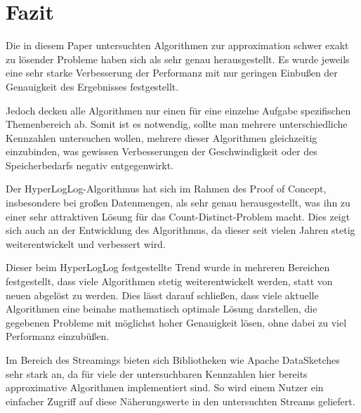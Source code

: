 \section{Fazit}

Die in diesem Paper untersuchten Algorithmen zur approximation schwer exakt zu lösender Probleme haben sich als sehr genau herausgestellt.
Es wurde jeweils eine sehr starke Verbesserung der Performanz mit nur geringen Einbußen der Genauigkeit des Ergebnisses festgestellt.

Jedoch decken alle Algorithmen nur einen für eine einzelne Aufgabe spezifischen Themenbereich ab.
Somit ist es notwendig, sollte man mehrere unterschiedliche Kennzahlen untersuchen wollen, mehrere dieser Algorithmen gleichzeitig einzubinden, was gewissen Verbesserungen der Geschwindigkeit oder des Speicherbedarfs negativ entgegenwirkt.

Der HyperLogLog-Algorithmus hat sich im Rahmen des Proof of Concept, insbesondere bei großen Datenmengen, als sehr genau herausgestellt, was ihn zu einer sehr attraktiven Lösung für das Count-Distinct-Problem macht.
Dies zeigt sich auch an der Entwicklung des Algorithmus, da dieser seit vielen Jahren stetig weiterentwickelt und verbessert wird.

Dieser beim HyperLogLog festgestellte Trend wurde in mehreren Bereichen festgestellt, dass viele Algorithmen stetig weiterentwickelt werden, statt von neuen abgelöst zu werden.
Dies lässt darauf schließen, dass viele aktuelle Algorithmen eine beinahe mathematisch optimale Lösung darstellen, die gegebenen Probleme mit möglichst hoher Genauigkeit lösen, ohne dabei zu viel Performanz einzubüßen.

Im Bereich des Streamings bieten sich Bibliotheken wie Apache DataSketches sehr stark an, da für viele der untersuchbaren Kennzahlen hier bereits approximative Algorithmen implementiert sind.
So wird einem Nutzer ein einfacher Zugriff auf diese Näherungswerte in den untersuchten Streams geliefert.